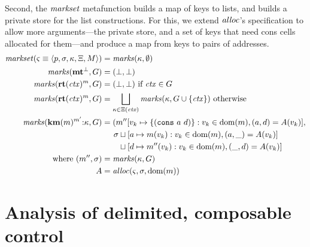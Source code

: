 {Second, the $\mathit{markset}$ metafunction builds a map of keys to lists, and builds a private store for the list constructions.
%
For this, we extend $\mathit{alloc}$'s specification to allow more arguments---the private store, and a set of keys that need cons cells allocated for them---and produce a map from keys to pairs of addresses.
%
\newcommand{\markaux}{\mathit{marks}}
\begin{align*}
  \domarkset(\mstate\equiv\tpl{\mpoint,\mstore,\mkont,\mktab,\mmemo}) &= \markaux(\mkont,\emptyset) \\
  \markaux(\kmt^\bot, G) &= (\bot, \bot) \\
  \markaux(\krt{\mctx}^\mmarks, G) &= (\bot, \bot) \text{ if } \mctx \in G \\ %
  \markaux(\krt{\mctx}^\mmarks, G) &= \bigsqcup\limits_{\mkont\in \mktab(\mctx)}{\markaux(\mkont,G \cup \set{\mctx})} \text{ otherwise} \\
  \markaux(\kcons{\kwcm{\mmarks}^{\mmarks'}}{\mkont}, G) &= (\mmarks''[\mval_k \mapsto \set{\cons{a}{d}} : \mval_k \in \dom(\mmarks), (a, d) = A(\mval_k)], \\
    &\phantom{= (}
      \mstore\sqcup[a \mapsto \mmarks(\mval_k) : \mval_k \in \dom(\mmarks), (a,\_) = A(\mval_k)] \\
    &\phantom{= (\mstore}\sqcup[d \mapsto \mmarks''(\mval_k) : \mval_k \in \dom(\mmarks), (\_,d) = A(\mval_k)]
   \\ \text{where } (\mmarks'', \mstore) &= \markaux(\mkont, G)
   \\ A &= \alloc(\mstate, \mstore, \dom(\mmarks))
\end{align*}
}

\section{Analysis of delimited, composable control}
\label{sec:sr}


